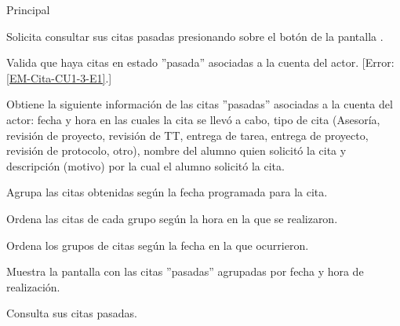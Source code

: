 \begin{UCtrayectoria}{Principal}

	\UCpaso [\UCactor] Solicita consultar sus citas pasadas presionando sobre el botón  de la pantalla .

	\UCpaso Valida que haya citas en estado ''pasada'' asociadas a la cuenta del actor. [Error: \ref{EM-Cita-CU1-3-E1}.]

	\UCpaso Obtiene la siguiente información de las citas ''pasadas'' asociadas a la cuenta del actor: fecha y hora en las cuales la cita se llevó a cabo, tipo de cita (Asesoría, revisión de proyecto, revisión de TT, entrega de tarea, entrega de proyecto, revisión de protocolo, otro), nombre del alumno quien solicitó la cita y descripción (motivo) por la cual el alumno solicitó la cita.

	\UCpaso Agrupa las citas obtenidas según la fecha programada para la cita.

	\UCpaso Ordena las citas de cada grupo según la hora en la que se realizaron. 

	\UCpaso Ordena los grupos de citas según la fecha en la que ocurrieron.

	\UCpaso Muestra la pantalla  con las citas ''pasadas'' agrupadas por fecha y hora de realización. 

	\UCpaso [\UCactor] Consulta sus citas pasadas. 

\end{UCtrayectoria}
